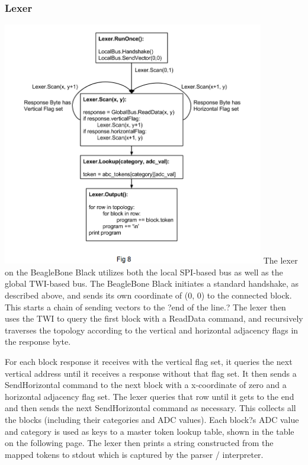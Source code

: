 \documentclass[12pt,a4paper]{article}
\begin{document}
    \subsubsection{Lexer}
    \includegraphics[width=4.5in]{LX.png}
    The lexer on the BeagleBone Black utilizes both the local SPI-based bus as well as the global TWI-based bus. The BeagleBone Black initiates a standard handshake, as described above, and sends its own coordinate of (0, 0) to the connected block. This starts a chain of sending vectors to the ?end of the line.? The lexer then uses the TWI to query the first block with a ReadData command, and recursively traverses the topology according to the vertical and horizontal adjacency flags in the response byte. 
    
    
    For each block response it receives with the vertical flag set, it queries the next vertical address until it receives a response without that flag set. It then sends a SendHorizontal command to the next block with a x-coordinate of zero and a horizontal adjacency flag set. The lexer queries that row until it gets to the end and then sends the next SendHorizontal command as necessary. This collects all the blocks (including their categories and ADC values). Each block?s ADC value and category is used as keys to a master token lookup table, shown in the table on the following page.     The lexer then prints a string constructed from the mapped tokens to stdout which is captured by the parser / interpreter.
    
\end{document}
